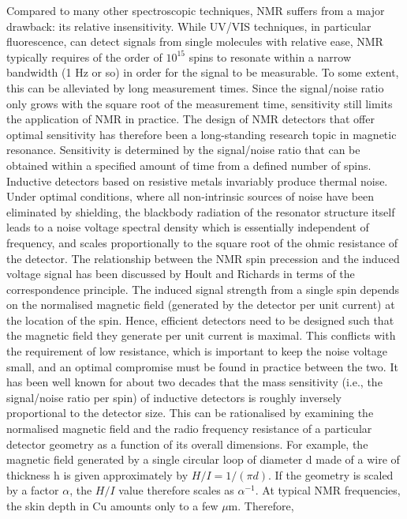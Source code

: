 Compared to many other spectroscopic techniques, NMR suffers from a major drawback: its relative 
insensitivity. While UV/VIS techniques, in particular fluorescence, can detect signals from single 
molecules with relative ease, NMR typically requires of the order of $10^{15}$ spins to resonate within a 
narrow bandwidth (1 Hz or so) in order for the signal to be measurable. To some extent, this can be 
alleviated by long measurement times. Since the signal/noise ratio only grows with the square root of 
the measurement time, sensitivity still limits the application of NMR in practice.
The design of NMR detectors that offer optimal sensitivity has therefore been a long-standing research 
topic in magnetic resonance. Sensitivity is determined by the signal/noise ratio that can be obtained 
within a specified amount of time from a defined number of spins. Inductive detectors based on 
resistive metals invariably produce thermal noise. Under optimal conditions, where all non-intrinsic 
sources of noise have been eliminated by shielding, the blackbody radiation of the resonator structure 
itself leads to a noise voltage spectral density which is essentially independent of frequency, and 
scales proportionally to the square root of the ohmic resistance of the detector. The relationship 
between the NMR spin precession and the induced voltage signal has been discussed by Hoult and Richards 
in terms of the correspondence principle.\cite{hoult1975cfd} The  induced signal strength from a single spin depends on 
the normalised magnetic field (generated by the detector per unit current) at the location of the spin. 
Hence, efficient detectors need to be designed such that the magnetic field they generate per unit 
current is maximal. This conflicts with the requirement of low resistance, which is important to keep 
the noise voltage small, and an optimal compromise must be found in practice between the two.
It has been well known for about two decades that the mass sensitivity (i.e., the signal/noise ratio 
per spin) of inductive detectors is roughly inversely proportional to the detector size. This can be 
rationalised by examining the normalised magnetic field and the radio frequency resistance of a 
particular detector geometry as a function of its overall dimensions. For example, the magnetic field 
generated by a single circular loop of diameter d made of a wire of thickness h is given approximately 
by $H/I=1/(\pi d)$. If the geometry is scaled by a factor $\alpha$, the $H/I$ value therefore scales as 
$\alpha^{-1}$. At typical NMR frequencies, the skin depth in Cu amounts only to a few $\mu$m. Therefore, 
